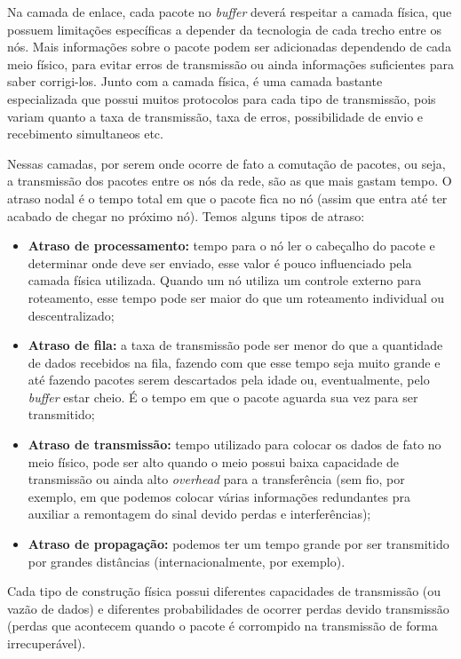 \documentclass[brazilian,a4paper,twocolumn]{article}
\begin{document}
Na camada de enlace, cada pacote no \textit{buffer} deverá respeitar a camada física, que possuem limitações específicas a depender da tecnologia de cada trecho entre os nós. Mais informações sobre o pacote podem ser adicionadas dependendo de cada meio físico, para evitar erros de transmissão ou ainda informações suficientes para saber corrigi-los. Junto com a camada física, é uma camada bastante especializada que possui muitos protocolos para cada tipo de transmissão, pois variam quanto a taxa de transmissão, taxa de erros, possibilidade de envio e recebimento simultaneos etc.

Nessas camadas, por serem onde ocorre de fato a comutação de pacotes, ou seja, a transmissão dos pacotes entre os nós da rede, são as que mais gastam tempo. O atraso nodal é o tempo total em que o pacote fica no nó (assim que entra até ter acabado de chegar no próximo nó). Temos alguns tipos de atraso:

\begin{itemize}
    \item \textbf{Atraso de processamento:} tempo para o nó ler o cabeçalho do pacote e determinar onde deve ser enviado, esse valor é pouco influenciado pela camada física utilizada. Quando um nó utiliza um controle externo para roteamento, esse tempo pode ser maior do que um roteamento individual ou descentralizado;
    \item \textbf{Atraso de fila:} a taxa de transmissão pode ser menor do que a quantidade de dados recebidos na fila, fazendo com que esse tempo seja muito grande e até fazendo pacotes serem descartados pela idade ou, eventualmente, pelo \textit{buffer} estar cheio. É o tempo em que o pacote aguarda sua vez para ser transmitido;
    \item \textbf{Atraso de transmissão:} tempo utilizado para colocar os dados de fato no meio físico, pode ser alto quando o meio possui baixa capacidade de transmissão ou ainda alto \textit{overhead} para a transferência (sem fio, por exemplo, em que podemos colocar várias informações redundantes pra auxiliar a remontagem do sinal devido perdas e interferências);
    \item \textbf{Atraso de propagação:} podemos ter um tempo grande por ser transmitido por grandes distâncias (internacionalmente, por exemplo).
\end{itemize}

Cada tipo de construção física possui diferentes capacidades de transmissão (ou vazão de dados) e diferentes probabilidades de ocorrer perdas devido transmissão (perdas que acontecem quando o pacote é corrompido na transmissão de forma irrecuperável).
\end{document}
